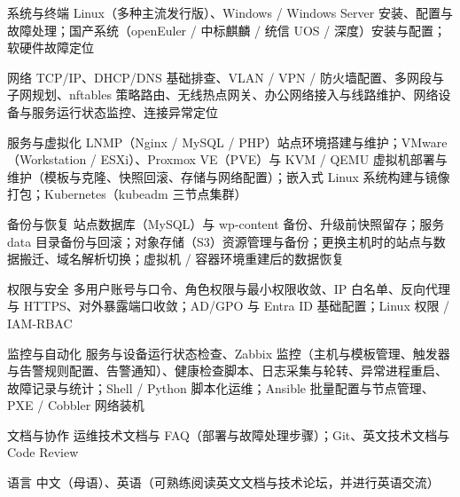 
\begin{cvskills}

  \cvskill
    {系统与终端}
    {Linux（多种主流发行版）、Windows / Windows Server 安装、配置与故障处理；国产系统（openEuler / 中标麒麟 / 统信 UOS / 深度）安装与配置；软硬件故障定位}

  \cvskill
    {网络}
    {TCP/IP、DHCP/DNS 基础排查、VLAN / VPN / 防火墙配置、多网段与子网规划、nftables 策略路由、无线热点网关、办公网络接入与线路维护、网络设备与服务运行状态监控、连接异常定位}

  \cvskill
    {服务与虚拟化}
    {LNMP（Nginx / MySQL / PHP）站点环境搭建与维护；VMware（Workstation / ESXi）、Proxmox VE（PVE）与 KVM / QEMU 虚拟机部署与维护（模板与克隆、快照回滚、存储与网络配置）；嵌入式 Linux 系统构建与镜像打包；Kubernetes（kubeadm 三节点集群）}

  \cvskill
    {备份与恢复}
    {站点数据库（MySQL）与 wp-content 备份、升级前快照留存；服务 data 目录备份与回滚；对象存储（S3）资源管理与备份；更换主机时的站点与数据搬迁、域名解析切换；虚拟机 / 容器环境重建后的数据恢复}

  \cvskill
    {权限与安全}
    {多用户账号与口令、角色权限与最小权限收敛、IP 白名单、反向代理与 HTTPS、对外暴露端口收敛；AD/GPO 与 Entra ID 基础配置；Linux 权限 / IAM-RBAC}

  \cvskill
    {监控与自动化}
    {服务与设备运行状态检查、Zabbix 监控（主机与模板管理、触发器与告警规则配置、告警通知）、健康检查脚本、日志采集与轮转、异常进程重启、故障记录与统计；Shell / Python 脚本化运维；Ansible 批量配置与节点管理、PXE / Cobbler 网络装机}

  \cvskill
    {文档与协作}
    {运维技术文档与 FAQ（部署与故障处理步骤）；Git、英文技术文档与 Code Review}

  \cvskill
    {语言}
    {中文（母语）、英语（可熟练阅读英文文档与技术论坛，并进行英语交流）}

\end{cvskills}
